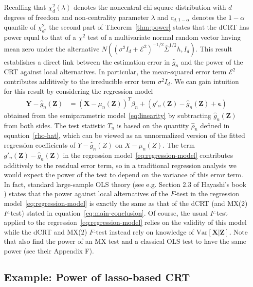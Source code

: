 \documentclass[12pt]{article}
\theoremstyle{definition}
\theoremstyle{remark}
\newcommand{\eps}{\epsilon}
\newcommand{\prx}{\bm X}
\newcommand{\srx}{X}
\newcommand{\prz}{\bm Z}
\newcommand{\srz}{Z}
\newcommand{\pry}{{\bm Y}}
\newcommand{\sry}{Y}
\begin{document}
Recalling that $\chi^2_d(\lambda)$ denotes the noncentral chi-square distribution with $d$ degrees of freedom and non-centrality parameter $\lambda$ and $c_{d,1-\alpha}$ denotes the $1-\alpha$ quantile of $\chi^2_d$, the second part of Theorem~\ref{thm:power} states that the dCRT has power equal to that of a $\chi^2$ test of a multivariate normal random vector having mean zero under the alternative $N((\sigma^2I_d +\mathcal E^2)^{-1/2}\overline \Sigma^{1/2} h, I_d)$. This result establishes a direct link between the estimation error in $\widehat g_n$ and the power of the CRT against local alternatives. In particular, the mean-squared error term $\mathcal E^2$ contributes additively to the irreducible error term $\sigma^2 I_d$. We can gain intuition for this result by considering the regression model
\begin{equation}
\begin{split}
\pry - \widehat g_n(\prz) &= (\prx - \mu_n(\prz))^T\beta_n + (g'_n(\prz) - \widehat g_n(\prz) + \bm \eps)
\label{eq:regression-model}
\end{split}
\end{equation}
obtained from the semiparametric model~\eqref{eq:linearity} by subtracting $\widehat g_n(\prz)$ from both sides. The test statistic $T_n$ is based on the quantity $\widehat \rho_n$ defined in equation~\eqref{rho-hat}, which can be viewed as an unnormalized version of the fitted regression coefficients of $\sry - \widehat g_n(\srz)$ on $\srx - \mu_n(\srz)$. The term $g'_n(\prz) - \widehat g_n(\prz)$ in the regression model~\eqref{eq:regression-model} contributes additively to the residual error term, so in a traditional regression analysis we would expect the power of the test to depend on the variance of this error term. In fact, standard large-sample OLS theory (see e.g. Section 2.3 of Hayashi's book \cite{Hayashi2000}) states that the power against local alternatives of the $F$-test in the regression model~\eqref{eq:regression-model} is exactly the same as that of the dCRT (and MX(2) $F$-test) stated in equation~\eqref{eq:main-conclusion}. Of course, the usual $F$-test applied to the regression~\eqref{eq:regression-model} relies on the validity of this model while the dCRT and MX(2) $F$-test instead rely on knowledge of $\text{Var}[\prx|\prz]$. Note that \cite{Wang2020b} also find the power of an MX test and a classical OLS test to have the same power (see their Appendix F).

\subsection{Example: Power of lasso-based CRT} \label{sec:power-lasso-based}
\end{document}
